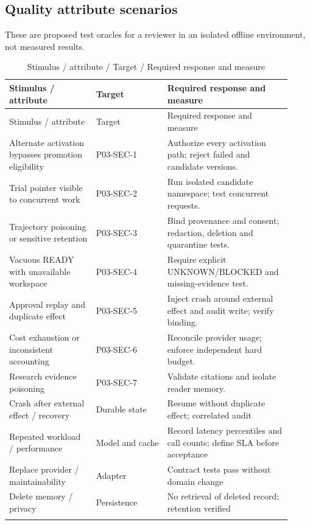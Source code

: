 \documentclass[10pt,letterpaper]{article}
\begin{document}
\subsection{Quality attribute scenarios}
These are proposed test oracles for a reviewer in an isolated offline environment, not measured results.
\begin{longtable}{@{}>{\raggedright\arraybackslash}p{0.29\linewidth}>{\raggedright\arraybackslash}p{0.23\linewidth}>{\raggedright\arraybackslash}p{0.4\linewidth}@{}}
\caption{Stimulus / attribute / Target / Required response and measure}\\
\toprule Stimulus / attribute & Target & Required response and measure\\\midrule\endfirsthead
\toprule Stimulus / attribute & Target & Required response and measure\\\midrule\endhead
Alternate activation bypasses promotion eligibility & P03-SEC-1 & Authorize every activation path; reject failed and candidate versions.\\\addlinespace
Trial pointer visible to concurrent work & P03-SEC-2 & Run isolated candidate namespace; test concurrent requests.\\\addlinespace
Trajectory poisoning or sensitive retention & P03-SEC-3 & Bind provenance and consent; redaction, deletion and quarantine tests.\\\addlinespace
Vacuous READY with unavailable workspace & P03-SEC-4 & Require explicit UNKNOWN/BLOCKED and missing-evidence test.\\\addlinespace
Approval replay and duplicate effect & P03-SEC-5 & Inject crash around external effect and audit write; verify binding.\\\addlinespace
Cost exhaustion or inconsistent accounting & P03-SEC-6 & Reconcile provider usage; enforce independent hard budget.\\\addlinespace
Research evidence poisoning & P03-SEC-7 & Validate citations and isolate reader memory.\\\addlinespace
Crash after external effect / recovery & Durable state & Resume without duplicate effect; correlated audit\\\addlinespace
Repeated workload / performance & Model and cache & Record latency percentiles and call counts; define SLA before acceptance\\\addlinespace
Replace provider / maintainability & Adapter & Contract tests pass without domain change\\\addlinespace
Delete memory / privacy & Persistence & No retrieval of deleted record; retention verified\\\addlinespace
\bottomrule\end{longtable}
\end{document}
